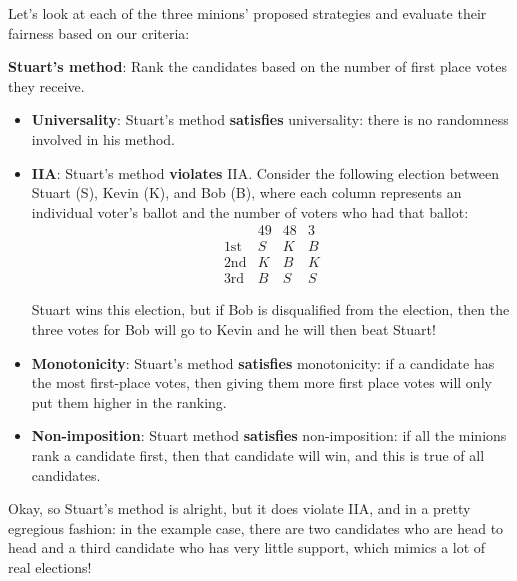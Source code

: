 \documentclass{article}
\begin{document}
Let’s look at each of the three minions’ proposed strategies and evaluate their fairness based on our criteria:

\textbf{Stuart’s method}: Rank the candidates based on the number of first place votes they receive.
\begin{itemize}
	\item \textbf{Universality}: Stuart’s method \textbf{satisfies} universality: there is no randomness involved in his method.
	\item \textbf{IIA}: Stuart’s method \textbf{violates} IIA. Consider the following election between Stuart (S), Kevin (K), and Bob (B), where each column represents an individual voter’s ballot and the number of voters who had that ballot:
	\[
		\begin{array}{c|ccc}
				& 49 & 48 & 3 \\
			\text{1st} & S & K & B \\
			\text{2nd} & K & B & K \\
			\text{3rd} & B & S & S
		\end{array}
	\]

	Stuart wins this election, but if Bob is disqualified from the election, then the three votes for Bob will go to Kevin and he will then beat Stuart! 
	\item \textbf{Monotonicity}: Stuart’s method \textbf{satisfies} monotonicity: if a candidate has the most first-place votes, then giving them more first place votes will only put them higher in the ranking. 
	\item \textbf{Non-imposition}: Stuart method \textbf{satisfies} non-imposition: if all the minions rank a candidate first, then that candidate will win, and this is true of all candidates. 
\end{itemize}
Okay, so Stuart’s method is alright, but it does violate IIA, and in a pretty egregious fashion: in the example case, there are two candidates who are head to head and a third candidate who has very little support, which mimics a lot of real elections! 
\end{document}
